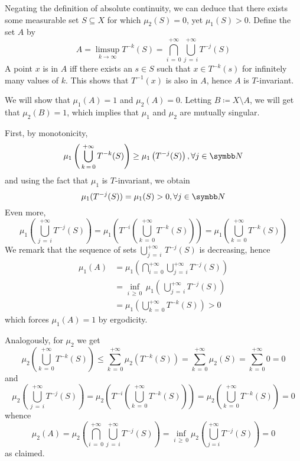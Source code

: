 \begin{problem}
\begin{enumerate}[a)]
    Negating the definition of absolute continuity, we can deduce that there exists some measurable set \(S \subseteq X\) for which \(\mu_2 (S) = 0\), yet \(\mu_1 (S) > 0\). Define the set \(A\) by
    \[
        A = \limsup_{k \to \infty} {T^{-k} (S)} = \bigcap_{i \, = \, 0}^{+\infty} \bigcup_{j \, = \, i}^{+\infty} T^{-j} (S)
    \]
    A point \(x\) is in \(A\) iff there exists an \(s \in S\) such that \(x \in T^{-k} (s)\) for infinitely many values of \(k\). This shows that \(T^{-1} (x)\) is also in \(A\), hence \(A\) is \(T\)-invariant.

    We will show that \(\mu_1 (A) = 1\) and \(\mu_2 (A) = 0\). Letting \(B \coloneq X \setminus A\), we will get that \(\mu_2 (B) = 1\), which implies that \(\mu_1\) and \(\mu_2\) are mutually singular.

    First, by monotonicity,
    \[
        \mu_1 \left(\, \bigcup_{k \, = \, 0}^{+\infty} T^{-k} (S)\right) \geq \mu_1 \left(T^{-j} (S)\right), \forall j \in \naturals
    \]
    and using the fact that \(\mu_1\) is \(T\)-invariant, we obtain
    \[
        \mu_1 (T^{-j} (S)) = \mu_1 (S) > 0, \forall j \in \naturals
    \]
    Even more,
    \[
        \mu_1 \left(\, \bigcup_{j \, = \, i}^{+\infty} T^{-j} (S)\right) = \mu_1 \left(T^{-i} \left(\bigcup_{k \, = \, 0}^{+\infty} T^{-k} (S)\right)\right) = \mu_1 \left(\bigcup_{k \, = \, 0}^{+\infty} T^{-k} (S)\right)
    \]
    We remark that the sequence of sets \(\bigcup_{j \, = \, i}^{+\infty} \, T^{-j} (S)\) is decreasing, hence
    \begin{align*}
        \mu_1 (A) &= \mu_1 \left(\bigcap_{i \, = \, 0}^{+\infty} \bigcup_{j \, = \, i}^{+\infty} T^{-j} (S)\right) \\
        &= \inf_{i \, \geq \, 0} \, \mu_1 \left(\, \bigcup_{j \, = \, i}^{+\infty} T^{-j} (S)\right) \\
        &= \mu_1 \left(\bigcup_{k \, = \, 0}^{+\infty} T^{-k} (S)\right) > 0
    \end{align*}
    which forces \(\mu_1 (A) = 1\) by ergodicity.

    Analogously, for \(\mu_2\) we get
    \[
        \mu_2 \left(\bigcup_{k \, = \, 0}^{+\infty} T^{-k} (S)\right) \leq \sum_{k \, = \, 0}^{+\infty} \mu_2 \left(T^{-k} (S)\right) = \sum_{k \, = \, 0}^{+\infty} \mu_2 (S) = \sum_{k \, = \, 0}^{+\infty} 0 = 0
    \]
    and
    \[
        \mu_2 \left(\,\bigcup_{j \, = \, i}^{+\infty} T^{-j} (S)\right) = \mu_2 \left(T^{-i} \left(\bigcup_{k \, = \, 0}^{+\infty} T^{-k} (S)\right)\right) = \mu_2 \left(\bigcup_{k \, = \, 0}^{+\infty} T^{-k} (S)\right) = 0
    \]
    whence
    \[
        \mu_2 (A) = \mu_2 \left(\bigcap_{i \, = \, 0}^{+\infty} \bigcup_{j \, = \, i}^{+\infty} T^{-j} (S)\right) = \inf_{i \, \geq \, 0} \mu_2 \left(\bigcup_{j = i}^{+\infty} T^{-j} (S)\right) = 0
    \]
    as claimed.


\end{enumerate}
\end{problem}
